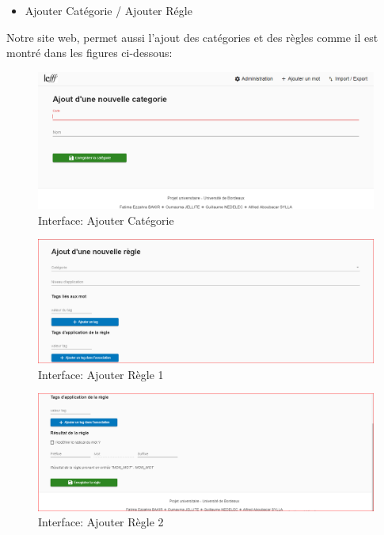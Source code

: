 \documentclass[12pt,a4paper]{article}
\begin{document}
\begin{itemize}  
  \item Ajouter Catégorie / Ajouter Régle 
\end{itemize}

Notre site web, permet aussi l'ajout des catégories et des règles comme il est montré dans les figures ci-dessous: 


\begin{figure}[!b]
\centering
\includegraphics{img/AjouterCat.PNG}
\caption{Interface: Ajouter Catégorie}
\label{Tux}
\end{figure}

\begin{figure}[!b]
\centering
\includegraphics{img/AjouterReg1.PNG}
\caption{Interface: Ajouter Règle 1}
\label{Tux}
\end{figure}

\begin{figure}[!b]
\centering
\includegraphics{img/AjouterReg2.PNG}
\caption{Interface: Ajouter Règle 2}
\label{Tux}
\end{figure}
 
\end{document}
